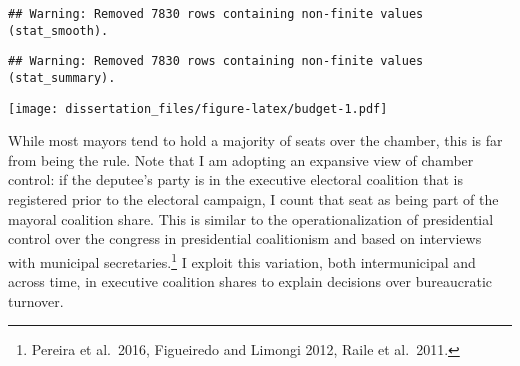 \documentclass[12pt,]{book}
\newenvironment{Shaded}{\begin{snugshade}}{\end{snugshade}}
\newcommand{\DataTypeTok}[1]{\textcolor[rgb]{0.13,0.29,0.53}{#1}}
\newcommand{\DecValTok}[1]{\textcolor[rgb]{0.00,0.00,0.81}{#1}}
\newcommand{\FloatTok}[1]{\textcolor[rgb]{0.00,0.00,0.81}{#1}}
\newcommand{\KeywordTok}[1]{\textcolor[rgb]{0.13,0.29,0.53}{\textbf{#1}}}
\newcommand{\NormalTok}[1]{#1}
\newcommand{\OperatorTok}[1]{\textcolor[rgb]{0.81,0.36,0.00}{\textbf{#1}}}
\newcommand{\StringTok}[1]{\textcolor[rgb]{0.31,0.60,0.02}{#1}}
\let\rmarkdownfootnote\footnote%
\def\footnote{\protect\rmarkdownfootnote}
\begin{document}
\begin{verbatim}
## Warning: Removed 7830 rows containing non-finite values (stat_smooth).
\end{verbatim}

\begin{verbatim}
## Warning: Removed 7830 rows containing non-finite values (stat_summary).
\end{verbatim}

\texttt{[image: dissertation\_files/figure-latex/budget-1.pdf]}

While most mayors tend to hold a majority of seats over the chamber, this is far from being the rule. Note that I am adopting an expansive view of chamber control: if the deputee's party is in the executive electoral coalition that is registered prior to the electoral campaign, I count that seat as being part of the mayoral coalition share. This is similar to the operationalization of presidential control over the congress in presidential coalitionism and based on interviews with municipal secretaries.\footnote{Pereira et al.~2016, Figueiredo and Limongi 2012, Raile et al.~2011.} I exploit this variation, both intermunicipal and across time, in executive coalition shares to explain decisions over bureaucratic turnover.

\begin{Shaded}
\end{Shaded}
\end{document}

